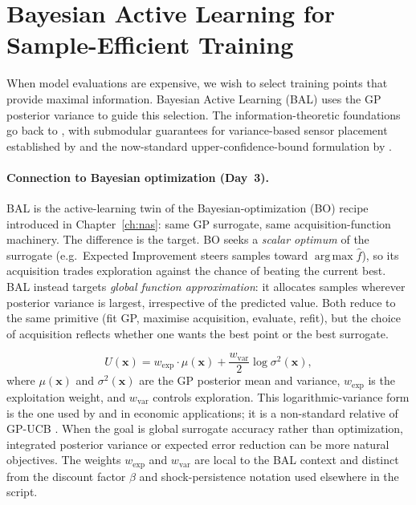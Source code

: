 \documentclass[11pt,a4paper]{report}
\newcommand{\x}{\bm{x}}
\DeclareMathOperator*{\argmax}{arg\,max}
\begin{document}
\section{Bayesian Active Learning for Sample-Efficient Training}
\label{sec:bal}

When model evaluations are expensive, we wish to select training points that provide maximal information.  Bayesian Active Learning (BAL) uses the GP posterior variance to guide this selection.  The information-theoretic foundations go back to \citet{mackay1992information}, with submodular guarantees for variance-based sensor placement established by \citet{krause2008near} and the now-standard upper-confidence-bound formulation by \citet{srinivas2010gaussian}.

\paragraph{Connection to Bayesian optimization (Day~3).}  BAL is the active-learning twin of the Bayesian-optimization (BO) recipe introduced in Chapter~\ref{ch:nas}: same GP surrogate, same acquisition-function machinery.  The difference is the target.  BO seeks a \emph{scalar optimum} of the surrogate (e.g.\ Expected Improvement steers samples toward $\argmax \hat f$), so its acquisition trades exploration against the chance of beating the current best.  BAL instead targets \emph{global function approximation}: it allocates samples wherever posterior variance is largest, irrespective of the predicted value.  Both reduce to the same primitive (fit GP, maximise acquisition, evaluate, refit), but the choice of acquisition reflects whether one wants the best point or the best surrogate.

\begin{definitionbox}
\begin{equation}
U(\x) = w_{\mathrm{exp}} \cdot \mu(\x) + \frac{w_{\mathrm{var}}}{2}\log\sigma^2(\x),
\end{equation}
where $\mu(\x)$ and $\sigma^2(\x)$ are the GP posterior mean and variance, $w_{\mathrm{exp}}$ is the exploitation weight, and $w_{\mathrm{var}}$ controls exploration.  This logarithmic-variance form is the one used by \citet{rennerscheidegger_2018} and \citet{SCHEIDEGGER201968} in economic applications; it is a non-standard relative of GP-UCB \citep{srinivas2010gaussian}.  When the goal is global surrogate accuracy rather than optimization, integrated posterior variance or expected error reduction can be more natural objectives.  The weights $w_{\mathrm{exp}}$ and $w_{\mathrm{var}}$ are local to the BAL context and distinct from the discount factor $\beta$ and shock-persistence notation used elsewhere in the script.
\end{definitionbox}
\end{document}
